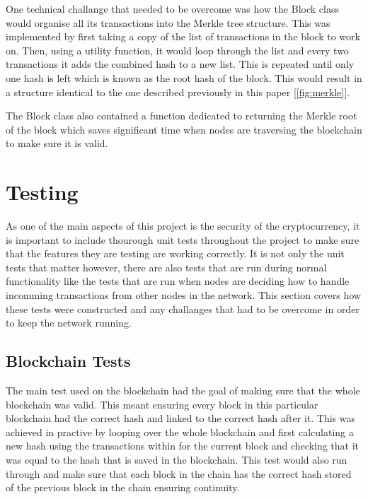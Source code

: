 \documentclass{l4proj}
\begin{document}
One technical challange that needed to be overcome was how the Block class would organise all its transactions
into the Merkle tree structure. This was implemented by first taking a copy of the list of transactions in the
block to work on. Then, using a utility function, it would loop through the list and every two transactions it 
adds the combined hash to a new list. This is repeated until only one hash is left which is known as the root 
hash of the block. This would result in a structure identical to the one described previously in this paper
[\ref{fig:merkle}].


The Block class also contained a function dedicated to returning the Merkle root of the block which saves 
significant time when nodes are traversing the blockchain to make sure it is valid.

\section{Testing}
As one of the main aspects of this project is the security of the cryptocurrency, it is important to include
thourough unit tests throughout the project to make sure that the features they are testing are working correctly.
It is not only the unit tests that matter however, there are also tests that are run during normal functionality
like the tests that are run when nodes are deciding how to handle incomming transactions from other nodes in the
network. This section covers how these tests were constructed and any challanges that had to be overcome in order
to keep the network running.

\subsection{Blockchain Tests}
The main test used on the blockchain had the goal of making sure that the whole blockchain was valid. This meant
ensuring every block in this particular blockchain had the correct hash and linked to the correct hash after it.
This was achieved in practive by looping over the whole blockchain and first calculating a new hash using the 
transactions within for the current block and checking that it was equal to the hash that is saved in the 
blockchain. This test would also run through and make sure that each block in the chain has the correct hash
stored of the previous block in the chain ensuring continuity.
\end{document}
